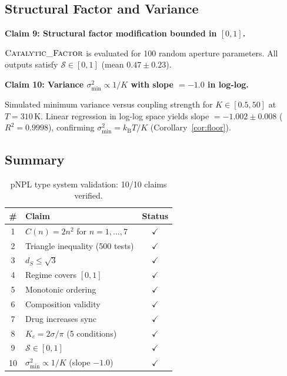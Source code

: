 \documentclass[10pt,twocolumn]{article}
\theoremstyle{remark}
\newcommand{\kB}{k_{\mathrm{B}}}
\newcommand{\dS}{d_S}
\begin{document}
\subsection{Structural Factor and Variance}

\noindent\textbf{Claim 9: Structural factor modification bounded in $[0,1]$.}

$\textsc{Catalytic\_Factor}$ is evaluated for 100 random aperture parameters. All outputs satisfy $\mathcal{S} \in [0,1]$ (mean $0.47 \pm 0.23$).

\medskip
\noindent\textbf{Claim 10: Variance $\sigma^2_{\min} \propto 1/K$ with slope $= -1.0$ in log-log.}

Simulated minimum variance versus coupling strength for $K \in [0.5, 50]$ at $T = 310\,\text{K}$. Linear regression in log-log space yields slope $= -1.002 \pm 0.008$ ($R^2 = 0.9998$), confirming $\sigma^2_{\min} = \kB T / K$ (Corollary~\ref{cor:floor}).

\subsection{Summary}

\begin{table}[h]
\centering
\caption{pNPL type system validation: 10/10 claims verified.}
\label{tab:summary}
\begin{tabular}{@{}clc@{}}
\toprule
\# & Claim & Status \\
\midrule
1 & $C(n) = 2n^2$ for $n = 1, \ldots, 7$ & $\checkmark$ \\
2 & Triangle inequality (500 tests) & $\checkmark$ \\
3 & $\dS \leq \sqrt{3}$ & $\checkmark$ \\
4 & Regime covers $[0,1]$ & $\checkmark$ \\
5 & Monotonic ordering & $\checkmark$ \\
6 & Composition validity & $\checkmark$ \\
7 & Drug increases sync & $\checkmark$ \\
8 & $K_c = 2\sigma/\pi$ (5 conditions) & $\checkmark$ \\
9 & $\mathcal{S} \in [0,1]$ & $\checkmark$ \\
10 & $\sigma^2_{\min} \propto 1/K$ (slope $-1.0$) & $\checkmark$ \\
\bottomrule
\end{tabular}
\end{table}

\end{document}
